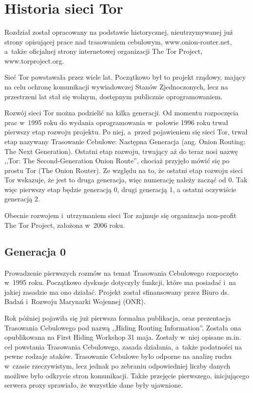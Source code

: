 \section{Historia sieci Tor}\paragraph{}
Rozdział został opracowany na podstawie historycznej, nieutrzymywanej już strony opisującej prace nad trasowaniem cebulowym, www.onion-router.net, a~także oficjalnej strony internetowej organizacji The Tor Project, www.torproject.org.

Sieć Tor powstawała przez wiele lat. Początkowo był to projekt rządowy, mający na celu ochronę komunikacji wywiadowczej Stanów Zjednoczonych, lecz na przestrzeni lat stał się wolnym, dostępnym publicznie oprogramowaniem\cite{onion_router_history, armed_forces}. 

Rozwój sieci Tor można podzielić na kilka generacji. Od momentu rozpoczęcia prac w~1995 roku do wydania oprogramowania w~połowie 1996 roku trwał pierwszy etap rozwoju projektu. Po niej, a~przed pojawieniem się sieci Tor, trwał etap nazywany Trasowanie Cebulowe: Następna Generacja (ang. Onion Routing: The Next Generation). Ostatni etap rozwoju, trwający aż do teraz nosi nazwę ,,Tor: The Second-Generation Onion Route'', chociaż przyjęło mówić się po prostu Tor (The Onion Router). Ze względu na to, że ostatni etap rozwoju sieci Tor wskazuje, że jest to druga generacja, więc numerację należy zacząć od 0. Tak więc pierwszy etap będzie generacją 0, drugi generacją 1, a ostatni oczywiście generacją 2\cite{onion_router}.

Obecnie rozwojem i~utrzymaniem sieci Tor zajmuje się organizacja non-profit The Tor Project, założona w~2006 roku\cite{roadmap_press_release}.

\subsection{Generacja 0}\paragraph{}
Prowadzenie pierwszych rozmów na temat Trasowania Cebulowego rozpoczęto w~1995 roku. Początkowo dyskusje dotyczyły funkcji, które ma posiadać i~na jakiej zasadzie ma ono działać. Projekt został sfinansowany przez Biuro ds. Badań i~Rozwoju Marynarki Wojennej (ONR)\cite{onion_router_history}.

Rok później pojawiła się już pierwsza formalna publikacja, oraz prezentacja Trasowania Cebulowego pod nazwą ,,Hiding Routing Information''. Została ona opublikowana na First Hiding Workshop 31 maja. Zostały w~niej opisane m.in. cel powstania Trasowania Cebulowego, zasada działania, a~także podatności na pewne rodzaje ataków. Trasowanie Cebulowe było odporne na analizę ruchu w~czasie rzeczywistym, lecz jednak po zebraniu odpowiedniej liczby danych możliwe było odkrycie stron komunikacji. Także przejęcie pierwszego, inicjującego serwera proxy sprawiało, że wszystkie dane były ujawnione\cite{hiding_routing_information}.

